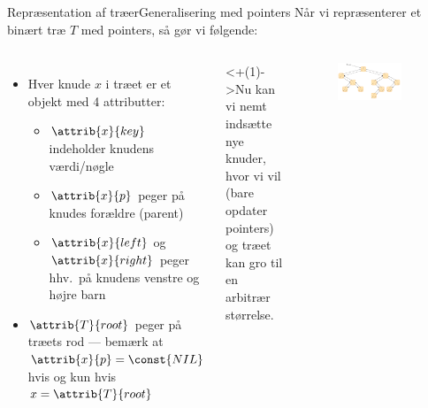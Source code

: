 \documentclass[aspectratio=1610]{beamer}
\begin{document}
\begin{frame}{Repræsentation af træer}{Generalisering med pointers}
    Når vi repræsenterer et binært træ $T$ med pointers, så gør vi følgende:

    \begin{columns}
        \begin{itemize}[<+(1)->]
            \item Hver knude $x$ i træet er et objekt med 4 attributter:
                \begin{itemize}
                    \item $\attrib{x}{key}$ indeholder knudens værdi/nøgle
                    \item $\attrib{x}{p}$ peger på knudes forældre (\alert{parent})
                    \item $\attrib{x}{left}$ og $\attrib{x}{right}$ peger hhv.\ på
                        knudens venstre og højre barn
                \end{itemize}
            \item $\attrib{T}{root}$ peger på træets rod --- bemærk at
                $\attrib{x}{p} = \const{NIL}$ hvis og kun hvis $x =
                \attrib{T}{root}$
        \end{itemize}    

        \uncover<+(1)->{Nu kan vi nemt indsætte nye knuder, hvor vi vil (bare
        opdater pointers) og træet kan gro til en arbitrær størrelse.}

        \begin{figure}[h]
            \centering
            \includegraphics[width=0.8\textwidth]{rooted-binary-tree}
        \end{figure}

    \end{columns}
    
\end{frame}
\end{document}
